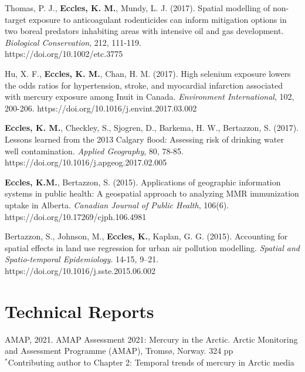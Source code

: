 \documentclass[margin,line]{res}
\begin{document}
\begin{resume}
\begin{etaremune}[start=25]
\item Thomas, P. J., \textbf{Eccles, K. M.}, Mundy, L. J. (2017). Spatial modelling of non-target exposure to anticoagulant rodenticides can inform mitigation options in two boreal predators inhabiting areas with intensive oil and gas development. \textit{Biological Conservation}, 212, 111-119. \\https://doi.org/10.1002/etc.3775

\item Hu, X. F., \textbf{Eccles, K. M.}, Chan, H. M. (2017). High selenium exposure lowers the odds ratios for hypertension, stroke, and myocardial infarction associated with mercury exposure among Inuit in Canada. \textit{Environment International}, 102, 200-206. https://doi.org/10.1016/j.envint.2017.03.002

\item \textbf{Eccles, K. M.}, Checkley, S., Sjogren, D., Barkema, H. W., Bertazzon, S. (2017). Lessons learned from the 2013 Calgary flood: Assessing risk of drinking water well contamination. \textit{Applied Geography}, 80, 78-85. https://doi.org/10.1016/j.apgeog.2017.02.005

\item \textbf{Eccles, K.M.}, Bertazzon, S. (2015). Applications of geographic information systems in public health: A geospatial approach to analyzing MMR immunization uptake in Alberta. \textit{Canadian Journal of Public Health}, 106(6). https://doi.org/10.17269/cjph.106.4981

\item Bertazzon, S., Johnson, M., \textbf{Eccles, K.}, Kaplan, G. G. (2015). Accounting for spatial effects in land use regression for urban air pollution modelling. \textit{Spatial and Spatio-temporal Epidemiology}. 14-15, 9–21. https://doi.org/10.1016/j.sste.2015.06.002

\end{etaremune}

\vspace*{.1in}
\section{\sc Technical Reports}
\begin{etaremune}
\item AMAP, 2021. AMAP Assessment 2021: Mercury in the Arctic. Arctic Monitoring and Assessment Programme (AMAP), Tromsø, Norway. 324 pp\\
$^{*}$Contributing author to Chapter 2: Temporal trends of mercury in Arctic media\\
\end{etaremune}
\vspace*{.1in}

\end{resume}
\end{document}
